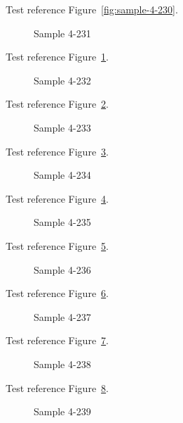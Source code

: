 Test reference Figure~\ref{fig:sample-4-230}.

\begin{figure}[tbhp]
\caption{Sample 4-231}
\label{fig:sample-4-231}
\end{figure}

Test reference Figure~\ref{fig:sample-4-231}.

\begin{figure}[tbhp]
\caption{Sample 4-232}
\label{fig:sample-4-232}
\end{figure}

Test reference Figure~\ref{fig:sample-4-232}.

\begin{figure}[tbhp]
\caption{Sample 4-233}
\label{fig:sample-4-233}
\end{figure}

Test reference Figure~\ref{fig:sample-4-233}.

\begin{figure}[tbhp]
\caption{Sample 4-234}
\label{fig:sample-4-234}
\end{figure}

Test reference Figure~\ref{fig:sample-4-234}.

\begin{figure}[tbhp]
\caption{Sample 4-235}
\label{fig:sample-4-235}
\end{figure}

Test reference Figure~\ref{fig:sample-4-235}.

\begin{figure}[tbhp]
\caption{Sample 4-236}
\label{fig:sample-4-236}
\end{figure}

Test reference Figure~\ref{fig:sample-4-236}.

\begin{figure}[tbhp]
\caption{Sample 4-237}
\label{fig:sample-4-237}
\end{figure}

Test reference Figure~\ref{fig:sample-4-237}.

\begin{figure}[tbhp]
\caption{Sample 4-238}
\label{fig:sample-4-238}
\end{figure}

Test reference Figure~\ref{fig:sample-4-238}.

\begin{figure}[tbhp]
\caption{Sample 4-239}
\label{fig:sample-4-239}
\end{figure}

